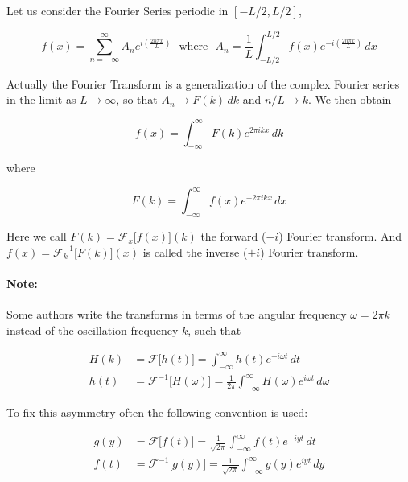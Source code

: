 \documentclass[a4paper]{article}
\begin{document}
Let us consider the Fourier Series periodic in $[-L/2, L/2]$,

\begin{equation*}
    f(x)=\sum_{n=-\infty}^{\infty} A_n e^{i(\frac{2n\pi x}{L})}\ \ \  \text{where}\ \ \ A_n=\frac{1}{L}\int_{-L/2}^{L/2} f(x)e^{-i(\frac{2n\pi x}{L})}\,dx
\end{equation*}

Actually the Fourier Transform is a generalization of the complex Fourier series in the limit as $L\rightarrow\infty$, so that $A_n\rightarrow F(k)\,dk$ and $n/L\rightarrow k$. We then obtain

\begin{equation*}
    f(x)=\int_{-\infty}^{\infty} F(k)e^{2\pi ikx}\,dk
\end{equation*}

where 

\begin{equation*}
    F(k)=\int_{-\infty}^{\infty} f(x)e^{-2\pi ikx}\,dx
\end{equation*}

Here we call $F(k)=\mathcal{F}_x\big[f(x)\big](k)$ the forward ($-i$) Fourier transform. And $f(x)=\mathcal{F}_k^{-1}\big[F(k)\big](x)$ is called the inverse ($+i$) Fourier transform.

\bigskip

\paragraph{Note:} Some authors write the transforms in terms of the angular frequency $\omega=2\pi k$ instead of the oscillation frequency $k$, such that

\begin{align*}
    H(k)&=\mathcal{F}\big[h(t)\big]=\int_{-\infty}^{\infty} h(t)e^{-i\omega t}\,dt\\[1em]
    h(t)&=\mathcal{F}^{-1}\big[H(\omega)\big]=\frac{1}{2\pi}\int_{-\infty}^{\infty} H(\omega)e^{i\omega t}\,d\omega
\end{align*}

To fix this asymmetry often the following convention is used:

\begin{align*}
    g(y)&=\mathcal{F}\big[f(t)\big]=\frac{1}{\sqrt{2\pi}}\int_{-\infty}^{\infty} f(t)e^{-iyt}\,dt\\[1em]
    f(t)&=\mathcal{F}^{-1}\big[g(y)\big]=\frac{1}{\sqrt{2\pi}}\int_{-\infty}^{\infty} g(y)e^{iyt}\,dy
\end{align*}
\end{document}
